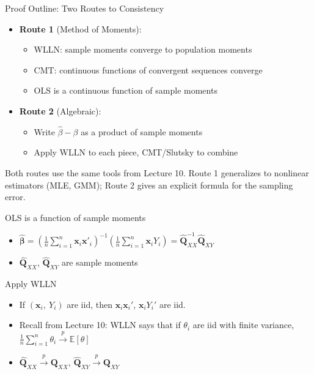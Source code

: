 \documentclass[aspectratio=169, handout, t]{beamer}
\numberwithin{equation}{section}
\begin{document}

\begin{frame}{Proof Outline: Two Routes to Consistency}
\begin{itemize}
\item \textbf{Route 1} (Method of Moments):
\begin{itemize}
\item WLLN: sample moments converge to population moments
\item CMT: continuous functions of convergent sequences converge
\item OLS is a continuous function of sample moments
\end{itemize}
\pause
\item \textbf{Route 2} (Algebraic):
\begin{itemize}
\item Write $\hat\beta - \beta$ as a product of sample moments
\item Apply WLLN to each piece, CMT/Slutsky to combine
\end{itemize}
\end{itemize}

\pause

Both routes use the same tools from Lecture 10. Route 1 generalizes to nonlinear estimators (MLE, GMM); Route 2 gives an explicit formula for the sampling error.

\end{frame}


\begin{frame}{OLS is a function of sample moments}
\begin{itemize}
\item $\bm{\hat{\beta}}=\left(\frac{1}{n}\sum_{i=1}^n\bm{x}_i\bm{x}'_i\right)^{-1}\left(\frac{1}{n}\sum_{i=1}^n\bm{x}_iY_i\right)=\bm{\hat{Q}}_{XX}^{-1}\bm{\hat{Q}}_{XY}$ \pause
\item $\bm{\hat{Q}}_{XX}$, $\bm{\hat{Q}}_{XY}$ are sample moments
\end{itemize}
\end{frame}


\begin{frame}{Apply WLLN}
\begin{itemize}
\item If $(\bm{x}_i,\ Y_i)$ are iid, then $\bm{x}_i\bm{x}_i'$, $\bm{x}_iY_i'$ are iid.\pause
\item Recall from Lecture 10: WLLN says that if $\theta_i$ are iid with finite variance, $\frac{1}{n} \sum_{i=1}^n \theta_i \overset{p}{\to} \mathbb{E}[\theta]$\pause
\item $\bm{\hat{Q}}_{XX} \overset{p}{\to} \bm{Q}_{XX}$, \quad $\bm{\hat{Q}}_{XY} \overset{p}{\to} \bm{Q}_{XY}$
\end{itemize}
\end{frame}
\end{document}
